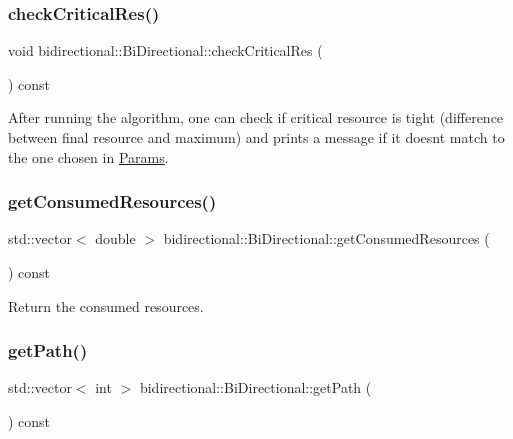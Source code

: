 \subsubsection{\texorpdfstring{check\+Critical\+Res()}{checkCriticalRes()}}
{\footnotesize\ttfamily void bidirectional\+::\+Bi\+Directional\+::check\+Critical\+Res (\begin{DoxyParamCaption}{ }\end{DoxyParamCaption}) const}

After running the algorithm, one can check if critical resource is tight (difference between final resource and maximum) and prints a message if it doesn\textquotesingle{}t match to the one chosen in \hyperlink{classbidirectional_1_1Params}{Params}. \mbox{\label{classbidirectional_1_1BiDirectional_a426412403ca7693f52b12a198d3f57c5}} 
\subsubsection{\texorpdfstring{get\+Consumed\+Resources()}{getConsumedResources()}}
{\footnotesize\ttfamily std\+::vector$<$ double $>$ bidirectional\+::\+Bi\+Directional\+::get\+Consumed\+Resources (\begin{DoxyParamCaption}{ }\end{DoxyParamCaption}) const}



Return the consumed resources. 

\mbox{\label{classbidirectional_1_1BiDirectional_a25af01f68ffce330a85922d02aa2ce88}} 
\subsubsection{\texorpdfstring{get\+Path()}{getPath()}}
{\footnotesize\ttfamily std\+::vector$<$ int $>$ bidirectional\+::\+Bi\+Directional\+::get\+Path (\begin{DoxyParamCaption}{ }\end{DoxyParamCaption}) const}



